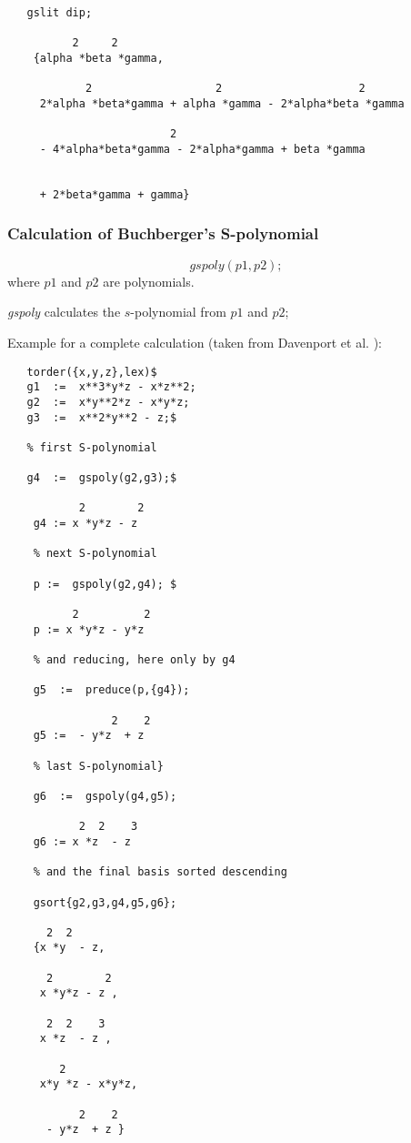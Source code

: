 \begin{verbatim}
   gslit dip;

          2     2
    {alpha *beta *gamma,

            2                   2                     2
     2*alpha *beta*gamma + alpha *gamma - 2*alpha*beta *gamma

                         2
     - 4*alpha*beta*gamma - 2*alpha*gamma + beta *gamma


     + 2*beta*gamma + gamma}
\end{verbatim}

\subsubsection{Calculation of Buchberger's S-polynomial}
\hypertarget{operator:GSPOLY}{}
\[ gspoly (p1,p2); \]
where $p1$  and $p2$ are polynomials.

\emph{gspoly} calculates the $s$-polynomial from $p1$  and $p2$;

Example for a complete calculation (taken from {\sc Davenport et al.}
 \cite{Davenport:88a}):
\begin{verbatim}
   torder({x,y,z},lex)$
   g1  :=  x**3*y*z - x*z**2;
   g2  :=  x*y**2*z - x*y*z;
   g3  :=  x**2*y**2 - z;$

   % first S-polynomial

   g4  :=  gspoly(g2,g3);$

           2        2
    g4 := x *y*z - z

    % next S-polynomial

    p :=  gspoly(g2,g4); $

          2          2
    p := x *y*z - y*z

    % and reducing, here only by g4

    g5  :=  preduce(p,{g4});

                2    2
    g5 :=  - y*z  + z

    % last S-polynomial}

    g6  :=  gspoly(g4,g5);

           2  2    3
    g6 := x *z  - z

    % and the final basis sorted descending

    gsort{g2,g3,g4,g5,g6};

      2  2
    {x *y  - z,

      2        2
     x *y*z - z ,

      2  2    3
     x *z  - z ,

        2
     x*y *z - x*y*z,

           2    2
      - y*z  + z }
\end{verbatim}
